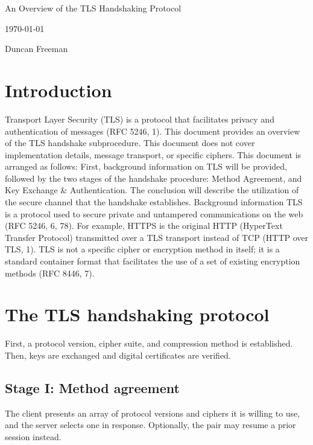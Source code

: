 \documentclass[12pt]{article}
\newcommand{\sectionheaderfmt}[1]{%
    \sffamily\bfseries\strut\color{white}#1
}
\newcommand{\titlebox}[2]{%
    \colorbox{#1}{%
        \sectionheaderfmt{#2}%
}}
\begin{document}
% 
\noindent
\titlebox{sectioncolor}{\large An Overview of the TLS Handshaking Protocol\hspace{5em}}

\medskip
\noindent
\titlebox{sectioncolor}{\large\today}

\medskip
\noindent
\titlebox{sectioncolor}{\large Duncan Freeman}

\newpage

\sffamily \tableofcontents \rmfamily

\newpage

\section{Introduction}
Transport Layer Security (TLS) is a protocol that facilitates privacy and authentication of messages (RFC 5246, 1). This document provides an overview of the TLS handshake subprocedure. This document does not cover implementation details, message transport, or specific ciphers. This document is arranged as follows: First, background information on TLS will be provided, followed by the two stages of the handshake procedure: Method Agreement, and Key Exchange \& Authentication. The conclusion will describe the utilization of the secure channel that the handshake establishes. 
Background information
TLS is a protocol used to secure private and untampered communications on the web (RFC 5246, 6, 78). For example, HTTPS is the original HTTP (HyperText Transfer Protocol) transmitted over a TLS transport instead of TCP (HTTP over TLS, 1). TLS is not a specific cipher or encryption method in itself; it is a standard container format that facilitates the use of a set of existing encryption methods (RFC 8446, 7).

\section{The TLS handshaking protocol}
First, a protocol version, cipher suite, and compression method is established. Then, keys are exchanged and digital certificates are verified.

\subsection{Stage I: Method agreement}

The client presents an array of protocol versions and ciphers it is willing to use, and the server selects one in response. Optionally, the pair may resume a prior session instead.
\end{document}
